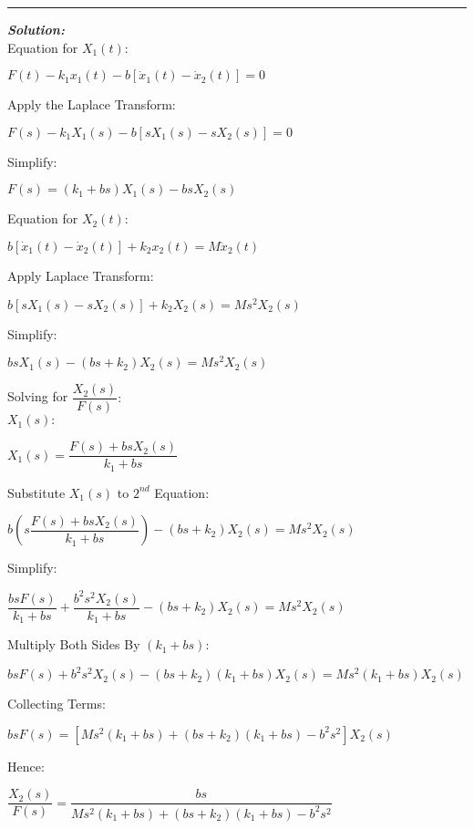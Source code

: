 \documentclass[11pt,letterpaper]{article}
\begin{document}
\rule{\textwidth}{1pt}
\vspace{12pt}
\textit{\textbf{Solution:}}\\
Equation for $X_1(t)$:\\
\begin{center}
	$F(t)-k_1x_1(t)-b[\dot{x}_1(t)-\dot{x}_2(t)]=0$\\[12pt]
\end{center}
Apply the Laplace Transform:\\
\begin{center}
	$F(s)-k_1X_1(s)-b[sX_1(s)-sX_2(s)]=0$\\
\end{center}
Simplify:\\
\begin{center}
	$F(s)=(k_1+bs)X_1(s)-bsX_2(s)$\\
\end{center}
Equation for $X_2(t)$:\\
\begin{center}
	$b[\dot{x}_1(t)-\dot{x}_2(t)]+k_2x_2(t)=M\ddot{x}_2(t)$\\
\end{center}
Apply Laplace Transform:\\
\begin{center}
	$b[sX_1(s)-sX_2(s)]+k_2X_2(s)=Ms^2X_2(s)$\\
\end{center}
Simplify:\\
\begin{center}
	$bsX_1(s)-(bs+k_2)X_2(s)=Ms^2X_2(s)$\\
\end{center}
Solving for $\dfrac{X_2(s)}{F(s)}:$\\[12pt]
$X_1(s):$\\
\begin{center}
	$X_1(s)=\dfrac{F(s)+bsX_2(s)}{k_1+bs}$
\end{center}
Substitute $X_1(s)$ to $2^{nd}$ Equation:\\
\begin{center}
	$b\left(s\dfrac{F(s)+bsX_2(s)}{k_1+bs}\right)-(bs+k_2)X_2(s)=Ms^2X_2(s)$
\end{center}
Simplify:\\
\begin{center}
	$\dfrac{bsF(s)}{k_1+bs}+\dfrac{b^2s^2X_2(s)}{k_1+bs}-(bs+k_2)X_2(s)=Ms^2X_2(s)$
\end{center}
Multiply Both Sides By $(k_1+bs)$:\\
\begin{center}
	$bsF(s)+b^2s^2X_2(s)-(bs+k_2)(k_1+bs)X_2(s)=Ms^2(k_1+bs)X_2(s)$\\
\end{center}
Collecting Terms:\\
\begin{center}
	$bsF(s)=[Ms^2(k_1+bs)+(bs+k_2)(k_1+bs)-b^2s^2]X_2(s)$\\
\end{center}
Hence:\\
\begin{center}
	$\dfrac{X_2(s)}{F(s)}=\dfrac{bs}{Ms^2(k_1+bs)+(bs+k_2)(k_1+bs)-b^2s^2}$\\
\end{center}
\end{document}
